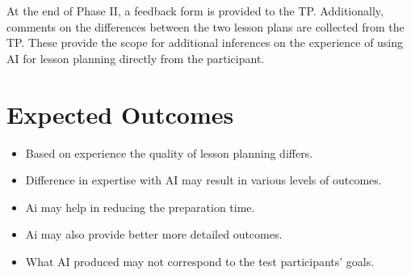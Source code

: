 \noindent At the end of Phase II, a feedback form is provided to the TP. Additionally, comments on the differences between the two lesson plans are collected from the TP. These provide the scope for additional inferences on the experience of using AI for lesson planning directly from the participant.

\section{Expected Outcomes}

\begin{itemize}
    \item Based on experience the quality of lesson planning differs.
    \item Difference in expertise with AI may result in various levels of outcomes. 
    \item Ai may help in reducing the preparation time. 
    \item Ai may also provide better more detailed outcomes. 
    \item What AI produced may not correspond to the test participants’ goals. 
\end{itemize}